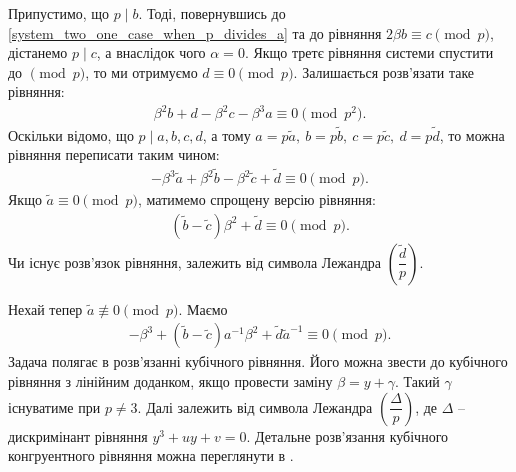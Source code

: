 \documentclass{thesis}
\begin{document}
Припустимо, що $p \mid b$. Тоді, повернувшись до \eqref{system_two_one_case_when_p_divides_a} та до рівняння $2\beta b \equiv c \pmod {p}$, дістанемо $p \mid c$, а внаслідок чого $\alpha = 0$. Якщо третє рівняння системи спустити до $\pmod p$, то ми отримуємо $d \equiv 0 \pmod p$. Залишається розв'язати таке рівняння:
\begin{align*}
\beta^2 b + d - \beta^2 c - \beta^3 a \equiv 0 \pmod {p^2}.
\end{align*}
Оскільки відомо, що $p \mid a,b,c,d$, а тому $a = p \tilde{a},\ b = p \tilde{b},\ c = p \tilde{c},\ d = p \tilde{d}$, то можна рівняння переписати таким чином:
\begin{align*}
-\beta^3 \tilde{a} + \beta^2 \tilde{b} - \beta^2 \tilde{c} + \tilde{d} \equiv 0 \pmod p.
\end{align*}
Якщо $\tilde{a} \equiv 0 \pmod p$, матимемо спрощену версію рівняння:
\begin{align*}
(\tilde{b} - \tilde{c})\beta^2 + \tilde{d} \equiv 0 \pmod p.
\end{align*}
Чи існує розв'язок рівняння, залежить від символа Лежандра $\left( \dfrac{\tilde{d}}{p} \right)$.

Нехай тепер $\tilde{a} \not\equiv 0 \pmod p$. Маємо
\begin{align*}
-\beta^3 + (\tilde{b} -\tilde{c}) a^{-1} \beta^2  + \tilde{d} \tilde{a}^{-1} \equiv 0 \pmod p.
\end{align*}
Задача полягає в розв'язанні кубічного рівняння. Його можна звести до кубічного рівняння з лінійним доданком, якщо провести заміну $\beta = y + \gamma$. Такий $\gamma$ існуватиме при $p \neq 3$. Далі залежить від символа Лежандра $\left( \dfrac{\Delta}{p} \right)$, де $\Delta$ -- дискримінант рівняння $y^3 + uy + v = 0$. Детальне розв'язання кубічного конгруентного рівняння можна переглянути в \cite{ahmad2012cubic}.
\end{document}
